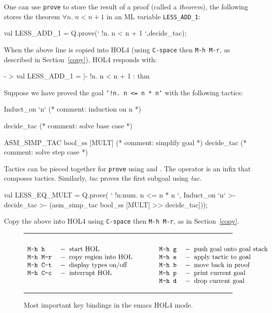 \documentclass[a4paper,10pt]{article}
\begin{document}

One can use {\tt prove} to store the result of a proof (called a
\emph{theorem}), \eg{} the following stores the theorem $\forall n.\;n < n +
1$ in an ML variable {\tt LESS\_ADD\_1}:
\begin{code}
val LESS_ADD_1 = Q.prove({`} !n. n < n + 1 {`},decide_tac);
\end{code}
When the above line is copied into HOL4 (using {\tt C-space} then
{\tt M-h M-r}, as described in Section~\ref{copy}), HOL4 responds with:
\begin{code}
- > val LESS_ADD_1 = |- !n. n < n + 1 : thm
\end{code}


Suppose we have proved the goal {\tt `!n{.}~n <= n * n`} with the following tactics:
\begin{code}
Induct_on `n`                   (* comment: induction on n  *)

  decide_tac                    (* comment: solve base case *)

  ASM_SIMP_TAC bool_ss [MULT]   (* comment: simplify goal   *)
  decide_tac                    (* comment: solve step case *)
\end{code}
Tactics can be pieced together for {\tt prove} using \ml{\gt\gt} and \ml{\gt-}. The \ml{\gt\gt} operator is an infix that composes tactics. Similarly, \ml{\gt-} \emph{tac} proves the first subgoal using \emph{tac}.
\begin{code}
val LESS_EQ_MULT = Q.prove(
  {`} !n:num. n <= n * n {`},
  Induct_on `n`
  >- decide_tac
  >- (asm_simp_tac bool_ss [MULT]
      >> decide_tac]));
\end{code}
Copy the above into HOL4 using {\tt C-space} then
{\tt M-h M-r}, as in Section~\ref{copy}.

\newcommand{\itemz}[2]{\texttt{#1}\; &-\;\; \textrm{#2}}
\newcommand{\itemy}[2]{#1&\quad\quad&#2\\}

\begin{figure}[t]
\hrule

\begin{displaymath}
\begin{array}{lllll}
\itemy{\itemz{\rule{0em}{1.5em}M-h h}{start HOL}}{\itemz{M-h g}{push goal onto goal stack}}
\itemy{\itemz{M-h M-r}{copy region into HOL}}{\itemz{M-h e}{apply tactic to goal}}
\itemy{\itemz{M-h C-t}{display types on/off}}{\itemz{M-h b}{move back in proof}}
\itemy{\itemz{M-h C-c}{interrupt HOL}}{\itemz{M-h p}{print current goal}}
\itemy{&}{\itemz{M-h d}{drop current goal}}
\end{array}
\end{displaymath}
\caption{Most important key bindings in the emacs HOL4 mode.}

\rule{0em}{1.5em}\hrule
\end{figure}
\end{document}
